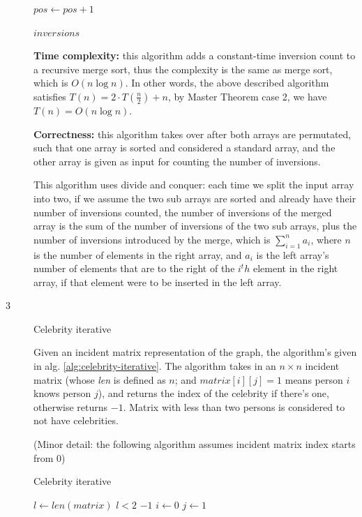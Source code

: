 \documentclass{article}
\begin{document}
\begin{description}
\begin{algorithm}[h]
\begin{algorithmic}[1]
        \State $pos \gets pos + 1$
      \EndWhile

      \State \Return $inversions$
    \EndFunction

    \end{algorithmic}
  \end{algorithm}
  
  \textbf{Time complexity:} this algorithm adds a constant-time inversion count to a recursive merge sort, thus the complexity is the same as merge sort, which is $O(n\log n)$. In other words, the above described algorithm satisfies $T(n) = 2 \cdot T(\frac{n}{2}) + n$, by Master Theorem case 2, we have $T(n) = O(n\log{n})$.

  \textbf{Correctness:} this algorithm takes over after both arrays are permutated, such that one array is sorted and considered a standard array, and the other array is given as input for counting the number of inversions. 

  This algorithm uses divide and conquer: each time we split the input array into two, if we assume the two sub arrays are sorted and already have their number of inversions counted, the number of inversions of the merged array is the sum of the number of inversions of the two sub arrays, plus the number of inversions introduced by the merge, which is $\sum_{i=1}^{n}{a_i}$, where $n$ is the number of elements in the right array, and $a_i$ is the left array's number of elements that are to the right of the $i^th$ element in the right array, if that element were to be inserted in the left array.

\item[3]{Celebrity iterative}

  Given an incident matrix representation of the graph, the algorithm's given in alg. \ref{alg:celebrity-iterative}. The algorithm takes in an $n \times n$ incident matrix (whose \textit{len} is defined as $n$; and $matrix[i][j] = 1$ means person $i$ knows person $j$), and returns the index of the celebrity if there's one, otherwise returns $-1$. Matrix with less than two persons is considered to not have celebrities.

  (Minor detail: the following algorithm assumes incident matrix index starts from 0)

  \begin{algorithm}[h]
  \caption{Celebrity iterative}
  \label{alg:celebrity-iterative}
    \begin{algorithmic}[1]
      \State $l \gets len(matrix)$
      \If $l < 2$
        \Return $-1$
      \EndIf
      \State $i \gets 0$
      \State $j \gets 1$


\end{algorithmic}
\end{algorithm}
\end{description}
\end{document}
